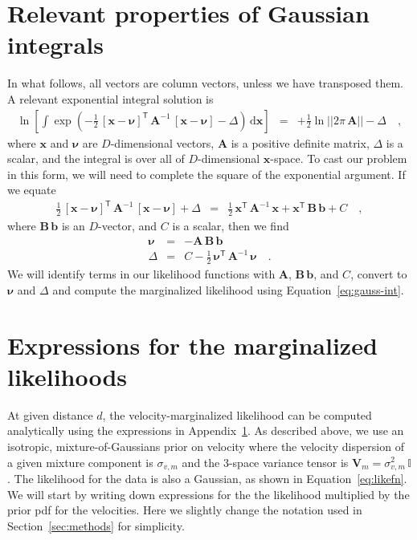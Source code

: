\documentclass[manuscript, letterpaper]{aastex6}
\newcommand{\project}[1]{\textsl{#1}}
\newcommand{\acronym}[1]{{\small{#1}}}
\newcommand{\apogee}{\project{\acronym{APOGEE}}}
\newcommand{\sectionname}{Section}
\newcommand{\eqname}{Equation}
\newcommand{\dd}{\mathrm{d}}
\newcommand{\transp}[1]{{#1}^{\!\mathsf{T}}}
\newcommand{\inv}[1]{{#1}^{-1}}
\newcommand{\bs}[1]{\boldsymbol{#1}}
\newcommand{\mat}[1]{\mathbf{#1}}
\renewcommand{\vec}[1]{\bs{#1}}
\newcommand{\eye}{\mathbb{I}}
\begin{document}




\appendix

\section{Relevant properties of Gaussian integrals}
\label{sec:appendixA}

In what follows, all vectors are column vectors, unless we have transposed them.
A relevant exponential integral solution is
\begin{eqnarray}
  \ln\left[\int\exp(-\frac{1}{2}\,
    \transp{[\vec{x}-\vec{\nu}]} \,
    \inv{\mat{A}} \,
    [\vec{x}-\vec{\nu}] - \Delta) \, \dd \vec{x}\right]
  &=& +\frac{1}{2}\ln ||2\pi\,\mat{A}|| -\Delta
  \quad , \label{eq:gauss-int}
\end{eqnarray}
where $\vec{x}$ and $\vec{\nu}$ are $D$-dimensional vectors, $\mat{A}$ is a
positive definite matrix, $\Delta$ is a scalar, and the integral is over all of
$D$-dimensional $\vec{x}$-space.
To cast our problem in this form, we will need to complete the square of the
exponential argument.
If we equate
\begin{eqnarray}
  \frac{1}{2}\,\transp{[\vec{x}-\vec{\nu}]}\,\inv{\mat{A}}\,[\vec{x}-\vec{\nu}] + \Delta
  &=& \frac{1}{2}\,\transp{\vec{x}}\,\inv{\mat{A}}\,\vec{x} + \transp{\vec{x}}\,\mat{B}\,\vec{b} + C
  \quad ,
\end{eqnarray}
where $\mat{B}\,\vec{b}$ is an $D$-vector, and $C$ is a scalar, then we find
\begin{eqnarray}
  \vec{\nu} &=& -\mat{A}\,\mat{B}\,\vec{b}
  \\
  \Delta & = & C - \frac{1}{2}\,\transp{\vec{\nu}}\,\inv{\mat{A}}\,\vec{\nu}
  \quad .
\end{eqnarray}
We will identify terms in our likelihood functions with $\mat{A}$,
$\mat{B}\,\vec{b}$, and $C$, convert to $\vec{\nu}$ and $\Delta$ and compute
the marginalized likelihood using \eqname~\ref{eq:gauss-int}.

\section{Expressions for the marginalized likelihoods}\label{sec:appendix}

At given distance $d$, the velocity-marginalized likelihood can be computed
analytically using the expressions in Appendix~\ref{sec:appendixA}.
As described above, we use an isotropic, mixture-of-Gaussians prior on velocity
where the velocity dispersion of a given mixture component is $\sigma_{v,m}$ and
the 3-space variance tensor is $\mat{V}_m = \sigma_{v,m}^2 \, \eye$.
The likelihood for the data is also a Gaussian, as shown in
\eqname~\ref{eq:likefn}.
We will start by writing down expressions for the the likelihood multiplied by
the prior pdf for the velocities.
Here we slightly change the notation used in \sectionname~\ref{sec:methods} for
simplicity.
\end{document}
